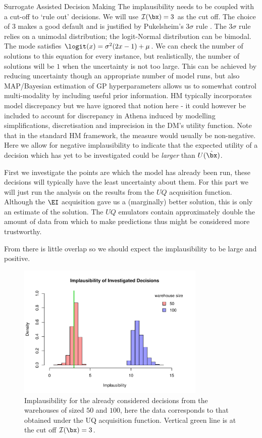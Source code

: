 \begin{chapter}{Surrogate Assisted Decision Making \label{Chap:optimisation}}
The implausibility needs to be coupled with a cut-off to `rule out' decisions. We will use $\mathcal{I}(\bx) = 3$ as the cut off. The choice of $3$ makes a good default and is justified by Pukelsheim's $3\sigma$ rule \citep{Pukelsheim1994}. The $3\sigma$ rule relies on a unimodal distribution; the logit-Normal distribution can be bimodal. The mode satisfies $\logit (x) = \sigma^2 (2x - 1) + \mu$. We can check the number of solutions to this equation for every instance, but realistically, the number of solutions will be $1$ when the uncertainty is not too large. This can be achieved by reducing uncertainty though an appropriate number of model runs, but also MAP/Bayesian estimation of GP hyperparameters allows us to somewhat control multi-modality by including useful prior information. HM typically incorporates model discrepancy but we have ignored that notion here - it could however be included to account for discrepancy in Athena induced by modelling simplifications, discretisation and imprecision in the DM's utility function. Note that in the standard HM framework, the measure would usually be non-negative. Here we allow for negative implausibility to indicate that the expected utility of a decision which has yet to be investigated could be \textit{larger} than $U(\hat{\bx})$.

First we investigate the points are which the model has already been run, these decisions will typically have the least uncertainty about them. For this part we will just run the analysis on the results from the $UQ$ acquisition function. Although the $\EI$ acquisition gave us a (marginally) better solution, this is only an estimate of the solution. The $UQ$ emulators contain approximately double the amount of data from which to make predictions thus might be considered more trustworthy.

 From  there is little overlap so we should expect the implausibility to be large and positive.
\begin{figure}
  \centering
  \includegraphics[width=0.8\textwidth]{fig-optim2/hm-ucb2.pdf}
  \caption{Implausibility for the already considered decisions from the warehouses of sized $50$ and $100$, here the data corresponds to that obtained under the UQ acquisition function. Vertical green line is at the cut off $\mathcal{I}(\bx)=3$. }
  \label{Fig:hm-ucb}
\end{figure}


\end{chapter}
